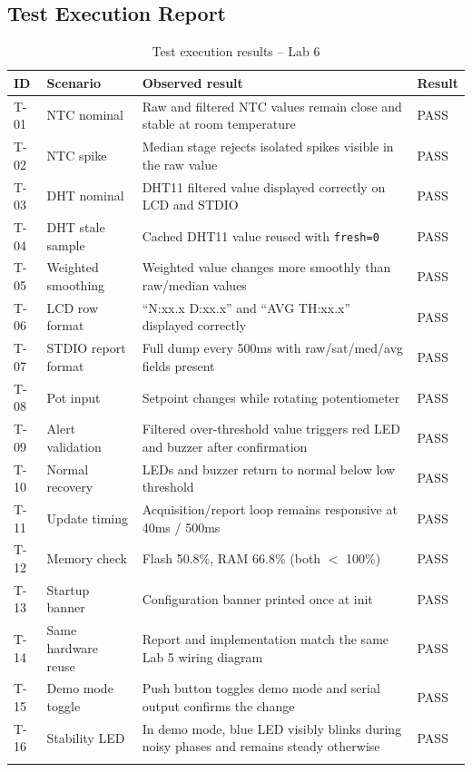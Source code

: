 \documentclass[12pt]{article}
\begin{document}
\subsection{Test Execution Report}

\begin{longtable}{p{0.8cm} p{3.5cm} p{6.5cm} p{1.5cm}}
\toprule
\textbf{ID} & \textbf{Scenario} & \textbf{Observed result} & \textbf{Result} \\
\midrule
\endhead
T-01 & NTC nominal & Raw and filtered NTC values remain close and stable at room temperature & PASS \\
T-02 & NTC spike & Median stage rejects isolated spikes visible in the raw value & PASS \\
T-03 & DHT nominal & DHT11 filtered value displayed correctly on LCD and STDIO & PASS \\
T-04 & DHT stale sample & Cached DHT11 value reused with \texttt{fresh=0} & PASS \\
T-05 & Weighted smoothing & Weighted value changes more smoothly than raw/median values & PASS \\
T-06 & LCD row format & ``N:xx.x D:xx.x'' and ``AVG TH:xx.x'' displayed correctly & PASS \\
T-07 & STDIO report format & Full dump every 500ms with raw/sat/med/avg fields present & PASS \\
T-08 & Pot input & Setpoint changes while rotating potentiometer & PASS \\
T-09 & Alert validation & Filtered over-threshold value triggers red LED and buzzer after confirmation & PASS \\
T-10 & Normal recovery & LEDs and buzzer return to normal below low threshold & PASS \\
T-11 & Update timing & Acquisition/report loop remains responsive at 40ms / 500ms & PASS \\
T-12 & Memory check & Flash 50.8\%, RAM 66.8\% (both $<$ 100\%) & PASS \\
T-13 & Startup banner & Configuration banner printed once at init & PASS \\
T-14 & Same hardware reuse & Report and implementation match the same Lab 5 wiring diagram & PASS \\
T-15 & Demo mode toggle & Push button toggles demo mode and serial output confirms the change & PASS \\
T-16 & Stability LED & In demo mode, blue LED visibly blinks during noisy phases and remains steady otherwise & PASS \\
\bottomrule
\caption{Test execution results -- Lab 6}
\label{tab:testresults}
\end{longtable}
\end{document}
